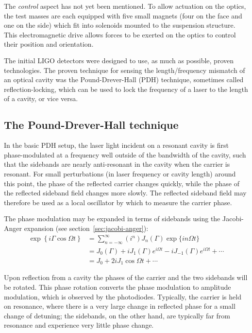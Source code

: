 The \emph{control} aspect has not yet been mentioned.  To allow
actuation on the optics, the test masses are each equipped with five
small magnets (four on the face and one on the side) which fit into
solenoids mounted to the suspension structure.  This electromagnetic
drive allows forces to be exerted on the optics to control their
position and orientation.
 
The initial LIGO detectors were designed to use, as much as possible,
proven technologies.  The proven technique for sensing the
length/frequency mismatch of an optical cavity was the
Pound-Drever-Hall (PDH)
technique\cite{Drever1983Laser,Black2001Introduction}, sometimes
called reflection-locking, which can be used to lock the frequency of
a laser to the length of a cavity, or vice versa.

\subsection{The Pound-Drever-Hall technique}
In the basic PDH setup, the laser light incident on a resonant cavity
is first phase-modulated at a frequency well outside of the bandwidth
of the cavity, such that the sidebands are nearly anti-resonant in the
cavity when the carrier is resonant.  For small perturbations (in
laser frequency or cavity length) around this point, the phase of the
reflected carrier changes quickly, while the phase of the reflected
sideband field changes more slowly.  The reflected sideband field may
therefore be used as a local oscillator by which to measure the
carrier phase.

The phase modulation may be expanded in terms of sidebands using the
Jacobi-Anger expansion (see section~\ref{sec:jacobi-anger}):
%
\begin{align}
\exp\left\{i\Gamma\cos\Omega t\right\} 
  &= \sum_{n=-\infty}^{\infty} \left(i^n\right)  J_n(\Gamma) \exp\{i n \Omega t\} \\
  &= J_0(\Gamma) + i J_{1}(\Gamma) e^{i\Omega t} - i J_{-1}(\Gamma) e^{i \Omega t}+\cdots \\
  &= J_0 + 2 i J_{1} \cos \Omega t + \cdots
\end{align}

Upon reflection from a cavity the phases of the carrier and the two
sidebands will be rotated.  This phase rotation converts the phase
modulation to amplitude modulation, which is observed by the
photodiodes.  Typically, the carrier is held on resonance, where there
is a very large change in reflected phase for a small change of
detuning; the sidebands, on the other hand, are typically far from
resonance and experience very little phase change.

